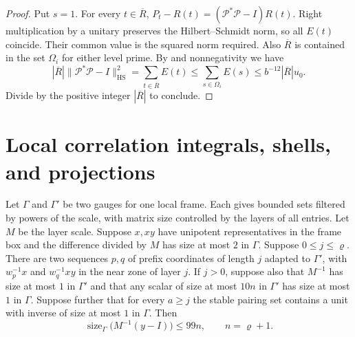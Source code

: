 \begin{proof}
Put $s=1$. For every $t\in\overline R$,
$P_t-R(t)=(\mathcal P^*\mathcal P-I)R(t)$.
Right multiplication by a unitary preserves the Hilbert--Schmidt norm, so all $E(t)$ coincide.
Their common value is the squared norm required.
Also $\overline R$ is contained in the set $\Omega_i$ for either level prime.
By  and nonnegativity we have
\[
 |\overline R|\|\mathcal P^*\mathcal P-I\|_{\mathrm{HS}}^2
 =\sum_{t\in\overline R}E(t)
 \le\sum_{s\in\Omega_i}E(s)
 \le b^{-12}|\overline R|u_0 .
\]
Divide by the positive integer $|\overline R|$ to conclude.
\end{proof}

\section{Local correlation integrals, shells, and projections}
\label{sec:b-local-mass}

\begin{lemma}
\label{lem:b-frame-matrix-reconstruction}
\emitthmsource
Let $\Gamma$ and $\Gamma'$ be two gauges for one local frame. Each gives bounded sets filtered by powers of the scale, with matrix size controlled by the layers of all entries. Let $M$ be the layer scale.
Suppose $x,xy$ have unipotent representatives in the frame box and the difference divided by $M$ has size at most $2$ in $\Gamma$.
Suppose $0\le j\le\varrho$. There are two sequences $p,q$ of prefix coordinates of length $j$ adapted to $\Gamma'$, with $w_p^{-1}x$ and $w_q^{-1}xy$ in the near zone of layer $j$.
If $j>0$, suppose also that $M^{-1}$ has size at most $1$ in $\Gamma'$ and that any scalar of size at most $10n$ in $\Gamma'$ has size at most $1$ in $\Gamma$.
Suppose further that for every $a\ge j$ the stable pairing set contains a unit with inverse of size at most $1$ in $\Gamma$. Then
\[
  \operatorname{size}_{\Gamma}\bigl(M^{-1}(y-I)\bigr)\le 99n,
  \qquad n=\varrho+1.
\]
\end{lemma}

